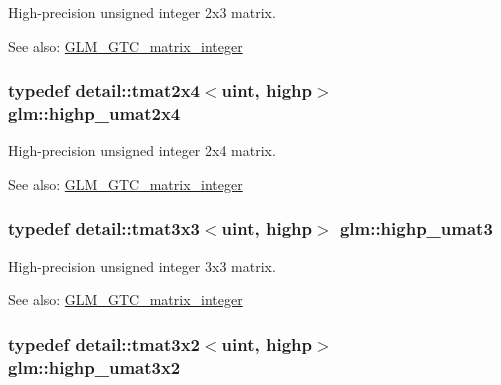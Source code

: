 High-precision unsigned integer 2x3 matrix. \begin{Desc}
\item[See also:]\hyperlink{group__gtc__matrix__integer}{GLM\_\-GTC\_\-matrix\_\-integer} \end{Desc}
\hypertarget{group__gtc__matrix__integer_gbe8572c228aecc0bfa7ba92415b1c651}{
\subsubsection[highp\_\-umat2x4]{\setlength{\rightskip}{0pt plus 5cm}typedef detail::tmat2x4$<$uint, highp$>$ {\bf glm::highp\_\-umat2x4}}}
\label{group__gtc__matrix__integer_gbe8572c228aecc0bfa7ba92415b1c651}


High-precision unsigned integer 2x4 matrix. \begin{Desc}
\item[See also:]\hyperlink{group__gtc__matrix__integer}{GLM\_\-GTC\_\-matrix\_\-integer} \end{Desc}
\hypertarget{group__gtc__matrix__integer_g2a271939d0123103f088e325e5123385}{
\subsubsection[highp\_\-umat3]{\setlength{\rightskip}{0pt plus 5cm}typedef detail::tmat3x3$<$uint, highp$>$ {\bf glm::highp\_\-umat3}}}
\label{group__gtc__matrix__integer_g2a271939d0123103f088e325e5123385}


High-precision unsigned integer 3x3 matrix. \begin{Desc}
\item[See also:]\hyperlink{group__gtc__matrix__integer}{GLM\_\-GTC\_\-matrix\_\-integer} \end{Desc}
\hypertarget{group__gtc__matrix__integer_g6f6a73ec605a515fb21d779663082ef9}{
\subsubsection[highp\_\-umat3x2]{\setlength{\rightskip}{0pt plus 5cm}typedef detail::tmat3x2$<$uint, highp$>$ {\bf glm::highp\_\-umat3x2}}}
\label{group__gtc__matrix__integer_g6f6a73ec605a515fb21d779663082ef9}


